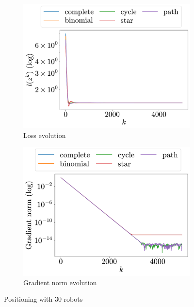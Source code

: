 \documentclass[a4paper,11pt,oneside]{book}
\begin{document}
\begin{figure}[H]
      \centering
      \begin{subfigure}[t]{0.46\linewidth}
            \centering
            \includegraphics[width=\linewidth]{./figs/aggregative/lots_agents/loss.pdf} 
            \caption{Loss evolution}
      \end{subfigure}
      \hfill
      \begin{subfigure}[t]{0.46\linewidth}
            \centering
            \includegraphics[width=\linewidth]{./figs/aggregative/lots_agents/gradient.pdf} 
            \caption{Gradient norm evolution}
      \end{subfigure}
      \caption{Positioning with $30$ robots}
      \label{fig:positioning_30}
\end{figure}
\end{document}
